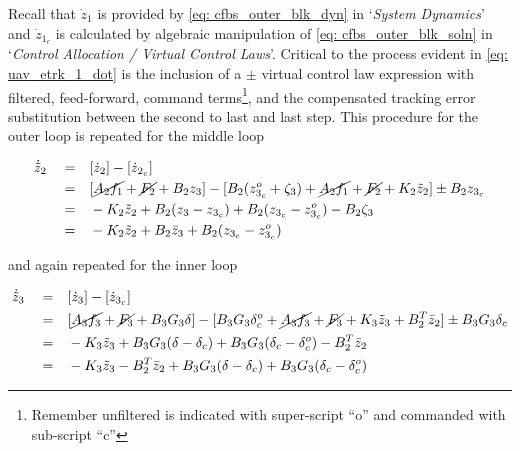 \documentclass[12pt]{ucthesis}
\begin{document}
Recall that $\dot{z}_1$ is provided by \ref{eq: cfbs_outer_blk_dyn} in `\textit{System Dynamics}' and $\dot{z}_{1_c}$ is calculated by algebraic manipulation of \ref{eq: cfbs_outer_blk_soln} in `\textit{Control Allocation / Virtual Control Laws}'. Critical to the process evident in \autoref{eq: uav_etrk_1_dot} is the inclusion of a $\pm$ virtual control law expression with filtered, feed-forward, command terms\footnote{Remember unfiltered is indicated with super-script ``o'' and commanded with sub-script ``c''}, and the compensated tracking error substitution between the second to last and last step. This procedure for the outer loop is repeated for the middle loop
\begin{fleqn} 
\begin{align} \label{eq: uav_etrk_2_dot}
\dot{\tilde{z}}_2 	\quad =& \quad [\dot{z}_2] - [\dot{z}_{2_c}] \nonumber \\
					\quad =& \quad [\cancel{A_2 f_1} + \cancel{F_2} + B_2 z_3] - [B_2(z^o_{3_c} + \zeta_3) + \cancel{A_2 f_1} + \cancel{F_2} + K_2 \tilde{z}_2] \pm B_2 z_{3_{c}} \nonumber \\
					\quad =& \quad -K_2 \tilde{z}_2 + B_2(z_3 - z_{3_c}) + B_2(z_{3_c}-z^o_{3_{c}}) - B_2 \zeta_3 \nonumber \\
					\quad =& \quad -K_2 \tilde{z}_2 + B_2 \bar{z}_3 + B_2(z_{3_c}-z^o_{3_{c}})
\end{align}
\end{fleqn}
and again repeated for the inner loop
\begin{fleqn}
\begin{align}  \label{eq: uav_etrk_3_dot}
\dot{\tilde{z}}_3 	\quad =& \quad [\dot{z}_3] - [\dot{z}_{3_c}] \nonumber \\
					\quad =& \quad [\cancel{A_3 f_3} + \cancel{F_3} + B_3 G_3 \delta] - [B_3 G_3 \delta^o_c + \cancel{A_3 f_3} + \cancel{F_3} + K_3 \tilde{z}_3 + B^T_2 \bar{z}_2] \pm B_3 G_3 \delta_c \nonumber \\
					\quad =& \quad -K_3 \tilde{z}_3 + B_3 G_3 (\delta - \delta_c) + B_3 G_3 (\delta_c - \delta^o_c) - B^T_2 \bar{z}_2 \nonumber \\
					\quad =& \quad -K_3 \tilde{z}_3 - B^T_2 \bar{z}_2 + B_3 G_3 (\delta - \delta_c) + B_3 G_3 (\delta_c - \delta^o_c)
\end{align}
\end{fleqn}
\end{document}
